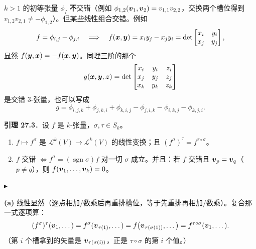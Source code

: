\documentclass[11pt]{ctexart}
\newcommand{\step}[1]{\par\vspace{3pt}\noindent
  {\color{violet}\small$\blacktriangleright$}\hspace{3pt}{\bfseries\color{violetdeep}#1}\par\vspace{1pt}}
\newcommand{\Lk}{\mathcal{L}}
\newcommand{\sgn}{\operatorname{sgn}}
\begin{document}

$k>1$ 的初等张量 $\phi_I$ \textbf{不}交错（例如 $\phi_{1,2}(\boldsymbol{v}_1,\boldsymbol{v}_2)=v_{1,1}v_{2,2}$，交换两个槽位得到 $v_{1,2}v_{2,1}\ne-\phi_{1,2}$）。但某些线性组合交错。例如
\[ f=\phi_{i,j}-\phi_{j,i}\quad\Longrightarrow\quad f(\boldsymbol{x},\boldsymbol{y})=x_iy_j-x_jy_i=\det\begin{bmatrix}x_i&y_i\\ x_j&y_j\end{bmatrix}, \]
显然 $f(\boldsymbol{y},\boldsymbol{x})=-f(\boldsymbol{x},\boldsymbol{y})$。同理三阶的那个
\[ g(\boldsymbol{x},\boldsymbol{y},\boldsymbol{z})=\det\begin{bmatrix}x_i&y_i&z_i\\ x_j&y_j&z_j\\ x_k&y_k&z_k\end{bmatrix} \]
是交错 $3$-张量，也可以写成
\[ g=\phi_{i,j,k}+\phi_{j,k,i}+\phi_{k,i,j}-\phi_{j,i,k}-\phi_{i,k,j}-\phi_{k,j,i}. \]




\begin{notecall}
\textbf{引理 27.3}．设 $f$ 是 $k$-张量，$\sigma,\tau\in S_k$。
\begin{enumerate}
  \item[\textbf{(a)}] $f\mapsto f^\sigma$ 是 $\Lk^k(V)\to\Lk^k(V)$ 的线性变换；且 $(f^\sigma)^\tau=f^{\tau\circ\sigma}$。
  \item[\textbf{(b)}] $f$ 交错 $\iff f^\sigma=(\sgn\sigma)f$ 对一切 $\sigma$ 成立。并且：若 $f$ 交错且 $\boldsymbol{v}_p=\boldsymbol{v}_q$（$p\ne q$），则 $f(\boldsymbol{v}_1,\dots,\boldsymbol{v}_k)=0$。
\end{enumerate}
\end{notecall}

\step{证明}
\textbf{(a)} 线性显然（逐点相加/数乘后再重排槽位，等于先重排再相加/数乘）。复合那一式逐项算：
\[ (f^\sigma)^\tau(\boldsymbol{v}_1,\dots)=f^\sigma(\boldsymbol{v}_{\tau(1)},\dots)
=f\bigl(\boldsymbol{v}_{\tau(\sigma(1))},\dots\bigr)=f^{\tau\circ\sigma}(\boldsymbol{v}_1,\dots). \]
（第 $i$ 个槽拿到的矢量是 $\boldsymbol{v}_{\tau(\sigma(i))}$，正是 $\tau\circ\sigma$ 的第 $i$ 个值。）
\end{document}
